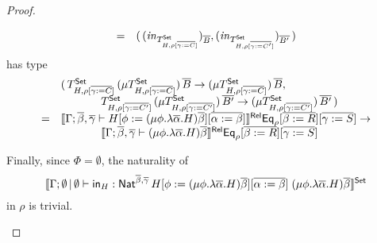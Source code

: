 \documentclass[acmsmall,review,anonymous]{acmart}
\theoremstyle{definition}
\newcommand{\set}{\mathsf{Set}}
\begin{document}
\begin{proof}
\begin{itemize}
\[\begin{array}{ll}
=& (\, (\mathit{in}_{T^\set_{H,\rho[\ol{\gamma := C}]}})_{\ol{B}},
(\mathit{in}_{T^\set_{H,\rho[\ol{\gamma := C'}]}})_{\ol{B'}}\,)
\end{array}\]
has type
\[\begin{array}{ll}
& (\, T^\set_{H,\rho[\ol{\gamma := C}]}\, (\mu
T^\set_{H,\rho[\ol{\gamma := C}]}) \, 
\ol{B} \to (\mu T^\set_{H,\rho[\ol{\gamma := C}]}) \, \ol{B}, \, \\
& \hspace*{0.5in}T^\set_{H,\rho[\ol{\gamma := C'}]}\, (\mu
T^\set_{H,\rho[\ol{\gamma := C'}]}) \, 
\ol{B'} \to (\mu T^\set_{H,\rho[\ol{\gamma := C'}]}) \,\ol{B'} \, )\\
= &
 \relsem{\Gamma;\ol{\beta},\ol{\gamma} \vdash H[\phi := (\mu
    \phi.\lambda {\overline \alpha}.H){\overline \beta}][\ol{\alpha :=
      \beta}]}\Eq_\rho[\ol{\beta := R}][\ol{\gamma := S}] \to\\
 & \hspace*{0.5in} \relsem{\Gamma;\ol{\beta},\ol{\gamma} \vdash (\mu
  \phi.\lambda \ol{\alpha}.H)\ol{\beta}} \Eq_\rho[\ol{\beta:=
    R}][\ol{\gamma :=S}]
\end{array}\]

Finally, since $\Phi = \emptyset$, the naturality of
\[
\setsem{\Gamma;\emptyset \,|\, \emptyset \vdash \tin_H :
  \Nat^{\ol{\beta},\ol{\gamma}} \, H[\phi := (\mu \phi.\lambda
    {\overline \alpha}.H){\overline \beta}][\ol{\alpha := \beta}]
  \;(\mu \phi.\lambda {\overline \alpha}.H){\overline \beta}}
\]
in $\rho$ is trivial.




\end{itemize}
\end{proof}
\end{document}
